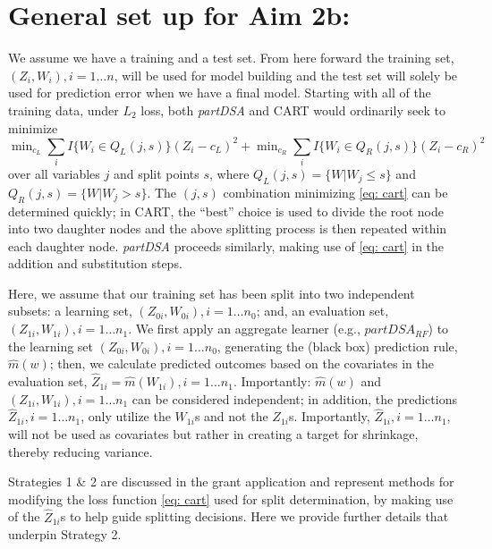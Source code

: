 \documentclass[12pt]{article}
\begin{document}
\section{General set up for Aim 2b:}


We assume we have a training and a test set. From here forward the training set, $(Z_i,W_i), i = 1 \ldots n$, will be used for model building and the test set will solely be used for prediction error when we have a final model. Starting with all of the training data, under $L_2$ loss,
both \emph{partDSA} and CART would ordinarily seek to minimize
\begin{equation} \label{eq: cart}
	\min\nolimits_{c_L} {\textstyle \sum\nolimits}_i I\{ W_{i} \in Q_{L}(j,s) \} (Z_{i}-c_L)^2
	+ \min\nolimits_{c_R} {\textstyle \sum\nolimits}_i
	I\{ W_{i} \in Q_{R}(j,s) \}
	(Z_{i}-c_R)^2
\end{equation}
over all variables $j$ and split points $s$, where
$Q_{L}(j,s) = \{W|W_{j} \leq s\}$ and $Q_{R}(j,s) = \{W|W_{j} >
s\}$.  %
The $(j,s)$ combination minimizing \eqref{eq: cart} can be determined
quickly; in CART, the ``best'' choice is used to divide the root node into
two daughter nodes and the above splitting process is then repeated
within each daughter node. \emph{partDSA} proceeds similarly, making use of \eqref{eq: cart} in the addition and substitution steps. 

Here, we assume that our training set has been split into two independent
subsets: a learning set, $(Z_{0i},W_{0i}), i = 1 \ldots n_0$; and, an evaluation set,
$(Z_{1i}, W_{1i}), i = 1 \ldots n_1$. We first apply an aggregate
learner (e.g., $partDSA_{RF}$) to the learning set $(Z_{0i}, W_{0i}),
i = 1 \ldots n_0$, generating the (black box) prediction rule,
$\hat{m}(w)$; then, we calculate predicted outcomes based on the covariates in the evaluation set,
$\widehat{Z}_{1i} = \hat{m}(W_{1i}), i = 1 \ldots n_1$.  Importantly:
$\hat{m}(w)$ and $(Z_{1i}, W_{1i}), i = 1 \ldots n_1$ can be
considered independent; in addition, the predictions
$\widehat{Z}_{1i}, i = 1 \ldots n_1$, only utilize the $W_{1i}$s and not
the $Z_{1i}$s. Importantly, $\widehat{Z}_{1i}, i = 1 \ldots n_1$, will
not be used as covariates but rather in creating a target for
shrinkage, thereby reducing variance.

 Strategies 1 \& 2 are
discussed in the grant application and represent methods for modifying
the loss function \eqref{eq: cart} used for split determination,
by making use of the $\widehat{Z}_{1i}$s to help guide splitting
decisions. Here we provide further details that underpin
Strategy 2.
\end{document}
